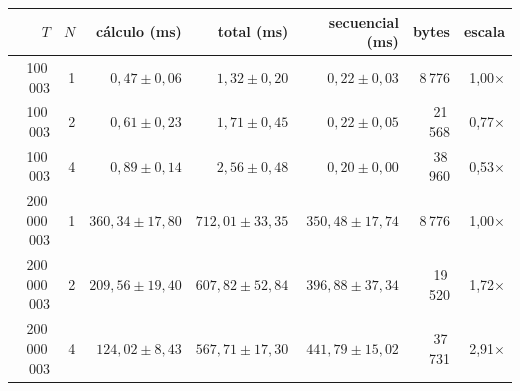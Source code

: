 \begin{tabular}{@{}rrrrrrr@{}}
\toprule
$T$ & $N$ & cálculo (ms) & total (ms) & secuencial (ms) & bytes & escala \\
\midrule
100\,003 & 1 & $0,47 \pm 0,06$ & $1,32 \pm 0,20$ & $0,22 \pm 0,03$ & 8\,776 & 1,00$\times$ \\
100\,003 & 2 & $0,61 \pm 0,23$ & $1,71 \pm 0,45$ & $0,22 \pm 0,05$ & 21\,568 & 0,77$\times$ \\
100\,003 & 4 & $0,89 \pm 0,14$ & $2,56 \pm 0,48$ & $0,20 \pm 0,00$ & 38\,960 & 0,53$\times$ \\
200\,000\,003 & 1 & $360,34 \pm 17,80$ & $712,01 \pm 33,35$ & $350,48 \pm 17,74$ & 8\,776 & 1,00$\times$ \\
200\,000\,003 & 2 & $209,56 \pm 19,40$ & $607,82 \pm 52,84$ & $396,88 \pm 37,34$ & 19\,520 & 1,72$\times$ \\
200\,000\,003 & 4 & $124,02 \pm 8,43$ & $567,71 \pm 17,30$ & $441,79 \pm 15,02$ & 37\,731 & 2,91$\times$ \\
\bottomrule
\end{tabular}
